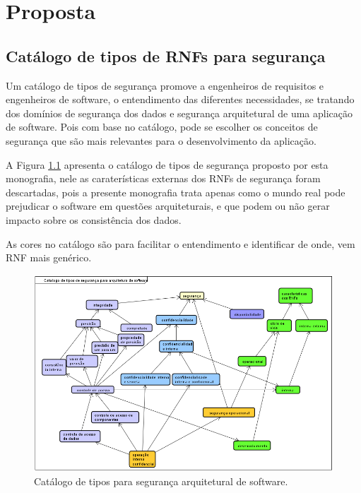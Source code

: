 \chapter{Proposta}
\label{chap:proposta}



\section{Catálogo de tipos de RNFs para segurança}

Um catálogo de tipos de segurança promove a engenheiros de requisitos e engenheiros de software, o entendimento das diferentes necessidades, se tratando dos domínios de segurança dos dados e segurança arquitetural de uma aplicação de software. Pois com base no catálogo, pode se escolher os conceitos de segurança que são mais relevantes para o desenvolvimento da aplicação.

A Figura \ref{catalogoDeTipos} apresenta o catálogo de tipos de segurança proposto por esta monografia, nele as caraterísticas externas dos RNFs de segurança foram descartadas, pois a presente monografia trata apenas como o mundo real pode prejudicar o software em questões arquiteturais, e que podem ou não gerar impacto sobre os consistência dos dados.    

As cores no catálogo são para facilitar o entendimento e identificar de onde, vem RNF mais genérico. 

\begin{figure}[h!]
	\centering
	\includegraphics[keepaspectratio=true,scale=0.8]{figuras/catalogoDeTiposSeguranca.PNG}
	\caption{Catálogo de tipos para segurança arquitetural de software.}
	\label{catalogoDeTipos}
\end{figure}

